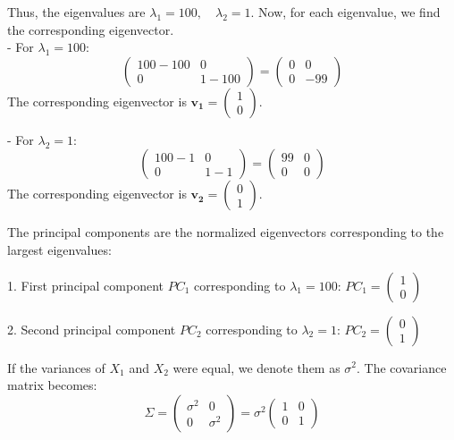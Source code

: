 \documentclass{article}
\begin{document}
\begin{enumerate}
\begin{enumerate}
        Thus, the eigenvalues are $\lambda_1 = 100, \quad \lambda_2 = 1$. Now, for each eigenvalue, we find the corresponding eigenvector.\\
        - For \(\lambda_1 = 100\):
        \[
            \begin{pmatrix}
            100 - 100 & 0 \\
            0 & 1 - 100
            \end{pmatrix} 
            =
            \begin{pmatrix}
            0 & 0 \\
            0 & -99
            \end{pmatrix}
        \]
        The corresponding eigenvector is \(\mathbf{v_1} = \begin{pmatrix} 1 \\ 0 \end{pmatrix}\).
        
        - For \(\lambda_2 = 1\):
        \[
            \begin{pmatrix}
            100 - 1 & 0 \\
            0 & 1 - 1
            \end{pmatrix} 
            =
            \begin{pmatrix}
            99 & 0 \\
            0 & 0
            \end{pmatrix}
        \]
        The corresponding eigenvector is \(\mathbf{v_2} = \begin{pmatrix} 0 \\ 1 \end{pmatrix}\).
        
        The principal components are the normalized eigenvectors corresponding to the largest eigenvalues:
        
        1. First principal component \(PC_1\) corresponding to \(\lambda_1 = 100\): $PC_1 = \begin{pmatrix} 1 \\ 0 \end{pmatrix}$
        
        2. Second principal component \(PC_2\) corresponding to \(\lambda_2 = 1\): $PC_2 = \begin{pmatrix} 0 \\ 1 \end{pmatrix}$
        
        If the variances of \(X_1\) and \(X_2\) were equal, we denote them as \(\sigma^2\). The covariance matrix becomes:
        \[
            \Sigma 
            = 
            \begin{pmatrix}
            \sigma^2 & 0 \\
            0 & \sigma^2
            \end{pmatrix} 
            = 
            \sigma^2 \begin{pmatrix}
            1 & 0 \\
            0 & 1
            \end{pmatrix}
        \]
        

\end{enumerate}
\end{enumerate}
\end{document}
